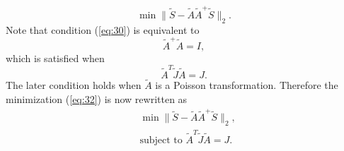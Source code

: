 \documentclass[12pt]{article}
\begin{document}
\begin{equation} \label{eq:34}
	\min \| \tilde S - \tilde A {\tilde A}^+ \tilde S \|_2.
\end{equation}
Note that condition (\ref{eq:30}) is equivalent to
\begin{equation} \label{eq:35}
	{\tilde A}^+ \tilde A = I,
\end{equation}
which is satisfied when
\begin{equation} \label{eq:36}
	\tilde A ^T \tilde J \tilde A = J.
\end{equation}
The later condition holds when $\tilde A$ is a Poisson transformation. Therefore the minimization (\ref{eq:32}) is now rewritten as
\begin{equation} \label{eq:symplectic-basis}
\begin{aligned}
	& \min \| \tilde S - \tilde A {\tilde A}^+ \tilde S \|_2, \\
	&\text{subject to } \tilde A ^T \tilde J \tilde A = J.
\end{aligned}
\end{equation}
\end{document}
